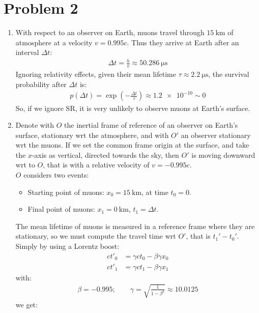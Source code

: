 \documentclass[../template.tex]{subfiles}
\begin{document}
\section{Problem 2}
\begin{enumerate}
    \item With respect to an observer on Earth, muons travel through $\SI{15}{\kilo\m}$ of atmosphere at a velocity $v = 0.995c$. Thus they arrive at Earth after an interval $\Delta t$:
    \begin{align*}
        \Delta t = \frac{h}{v} \approx \SI{50.286}{\micro\s} 
    \end{align*}  
    Ignoring relativity effects, given their mean lifetime $\tau \approx \SI{2.2}{\micro\s}$, the survival probability after $\Delta t$ is:
    \begin{align*}
        p(\Delta t) = \exp\left(-\frac{\Delta t}{\tau} \right)\approx \num{1.2e-10} \sim 0
    \end{align*}
    So, if we ignore SR, it is very unlikely to observe muons at Earth's surface.
    \item Denote with $O$ the inertial frame of reference of an observer on Earth's surface, stationary wrt the atmosphere, and with $O'$ an observer stationary wrt the muons. If we set the common frame origin at the surface, and take the $x$-axis as vertical, directed towards the sky, then $O'$ is moving downward wrt to $O$, that is with a relative velocity of $v = -0.995c$.\\
    $O$ considers two events:
    \begin{itemize}
        \item Starting point of muons: $x_0 = \SI{15}{\kilo\m}$, at time $t_0 = 0$.
        \item Final point of muons: $x_1 = \SI{0}{\kilo\m}$, $t_1 = \Delta t$.
    \end{itemize}
    The mean lifetime of muons is measured in a reference frame where they are stationary, so we must compute the travel time wrt $O'$, that is $t_1' - t_0'$. Simply by using a Lorentz boost:
    \begin{align*}
        ct'_0 &= \gamma ct_0  - \beta \gamma x_0  \\
        ct'_1 &= \gamma ct_1 - \beta \gamma x_1 
    \end{align*} 
    with:
    \begin{align*}
        \beta = -0.995; \qquad \gamma = \sqrt{\frac{1}{1-\beta^2} } \approx \num{10.0125}
    \end{align*} 
    we get:

\end{enumerate}
\end{document}
